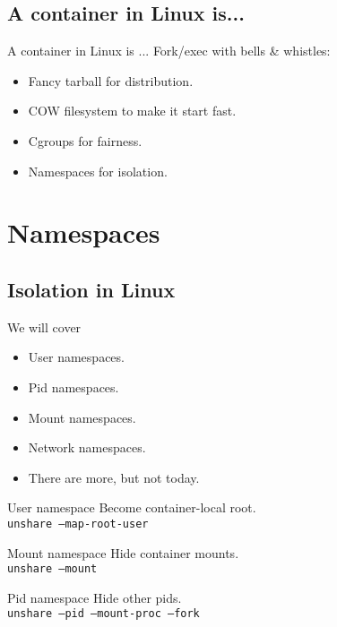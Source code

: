 \documentclass[14pt]{beamer}
\begin{document}
\subsection{A container in Linux is...}
\begin{frame}{A container in Linux is ...}
    \pause
    Fork/exec with bells \& whistles:
    \begin{itemize}[<+(1)->]
        \item Fancy tarball for distribution.
        \item COW filesystem to make it start fast.
        \item Cgroups for fairness.
        \item Namespaces for isolation.
    \end{itemize}
\end{frame}

\section{Namespaces}
\subsection{Isolation in Linux}
\begin{frame}{We will cover}
    \begin{itemize}[<+(1)->]
        \item User namespaces.
        \item Pid namespaces.
        \item Mount namespaces.
        \item Network namespaces.
        \item There are more, but not today.
    \end{itemize}
\end{frame}

\begin{frame}{User namespace}
    Become container-local root. \\
    {
        \tt unshare --map-root-user
    }
\end{frame}

\begin{frame}{Mount namespace}
    Hide container mounts. \\
    {
        \tt unshare --mount
    }
\end{frame}

\begin{frame}{Pid namespace}
    Hide other pids. \\
    {
        \tt unshare --pid --mount-proc --fork
    }
\end{frame}
\end{document}
